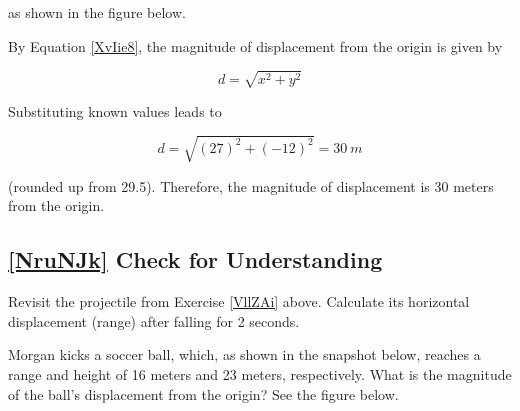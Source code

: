 \documentclass[main-physics.tex]{subfiles}
\begin{document}
as shown in the figure below.

\begin{center}
\end{center}

By Equation \eqref{XvIie8}, the magnitude of displacement from the origin is given by

\begin{equation*}
    d = \sqrt{x^2 + y^2}
\end{equation*}

Substituting known values leads to

\begin{equation*}
    d = \sqrt{\left(27\right)^2 + \left(-12\right)^2} = \SI{30}{m}
\end{equation*}

(rounded up from 29.5). Therefore, the magnitude of displacement is 30 meters from the origin.

\endsolution

\subsection*{\ref{NruNJk} Check for Understanding}

\begin{exercise} \label{Oj68jK}
    Revisit the projectile from Exercise \ref{VllZAi} above. Calculate its horizontal displacement (range) after falling for 2 seconds.
\end{exercise}

\begin{exercise} \label{BqN1QL}
    Morgan kicks a soccer ball, which, as shown in the snapshot below, reaches a range and height of 16 meters and 23 meters, respectively. What is the magnitude of the ball's displacement from the origin? See the figure below.
\end{exercise}
\end{document}
